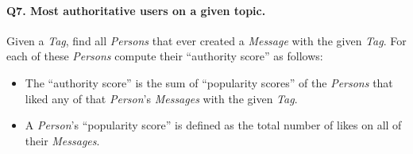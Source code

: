 \paragraph{\textbf{Q7}. Most authoritative users on a given topic.}
Given a \emph{Tag}, find all \emph{Persons} that ever created a
\emph{Message} with the given \emph{Tag}. For each of these
\emph{Persons} compute their ``authority score'' as follows:
\begin{itemize}
\tightlist
\item
  The ``authority score'' is the sum of ``popularity scores'' of the
  \emph{Persons} that liked any of that \emph{Person}'s \emph{Messages}
  with the given \emph{Tag}.
\item
  A \emph{Person}'s ``popularity score'' is defined as the total number
  of likes on all of their \emph{Messages}.
\end{itemize}
